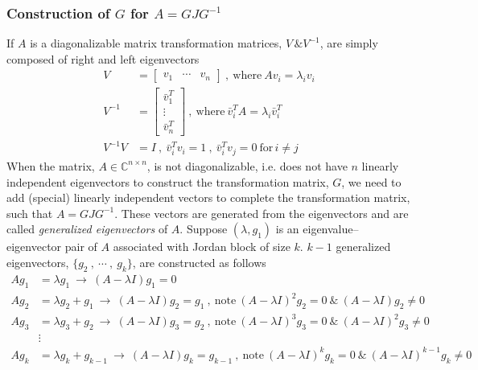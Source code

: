 \documentclass[twoside]{article}
\begin{document}
\subsubsection{Construction of $G$ for $A = GJ G^{-1} $}

If $A$ is a diagonalizable matrix transformation matrices, $V \, \& V^{-1}$, are simply composed of right and left eigenvectors 
%
\begin{align*}
 V &= \left[ \begin{array}{ccc} v_1 & \cdots & v_n \end{array} \right] \ , \ \mathrm{where} \ A v_i = \lambda_i v_i 
 \\
 V^{-1} &= \left[ \begin{array}{c} \bar{v}_1^T \\ \vdots \\ \bar{v}_n^T \end{array} \right] \ , \ \mathrm{where} \ \bar{v}_i^T A = \lambda_i \bar{v}_i^T
  \\
 V^{-1} V &= I \ , \ \bar{v}_i^T v_i = 1 \ , \  \bar{v}_i^T v_j = 0 \ \mathrm{for} \, i \neq j
\end{align*}
%
When the matrix, $A \in \mathbb{C}^{n \times n}$, is not diagonalizable, i.e. does not have $n$ linearly independent eigenvectors to
construct the transformation matrix, $G$, we need to add (special) linearly independent vectors to complete the transformation matrix, 
such that  $A = G J G^{-1}$. These vectors are generated from the eigenvectors and are called \textit{generalized eigenvec­tors} of $A$.
%
Suppose $(\lambda , g_1)$ is an eigenvalue--eigenvector pair of $A$ associated with Jordan block of size $k$. $k-1$ generalized eigenvec­tors, 
$\lbrace g_2 \ , \ \cdots \ , \ g_{k} \rbrace$, are constructed as follows 
%
\begin{align*}
	A g_1 &= \lambda g_1 \ \rightarrow \ (A - \lambda I) g_1 = 0
	\\
	A g_2 &= \lambda g_2 + g_1 \ \rightarrow \ (A - \lambda I) g_2 = g_1 \ , \ \mathrm{note} \ (A - \lambda I)^2 g_2 = 0 \ \& \ (A - \lambda I) g_2 \neq 0
		\\
	A g_3 &= \lambda g_3 + g_2 \ \rightarrow \ (A - \lambda I) g_3 = g_2 \ , \ \mathrm{note} \ (A - \lambda I)^3 g_3 = 0 \ \& \ (A - \lambda I)^2 g_3 \neq 0
	\\
	&\vdots
	\\
	A g_{k} &= \lambda g_{k} + g_{k-1} \ \rightarrow \ (A - \lambda I) g_k = g_{k-1} \ , \ \mathrm{note} \ (A - \lambda I)^k g_k = 0 \ \& \ (A - \lambda I)^{k-1} g_{k} \neq 0
\end{align*}
\end{document}
